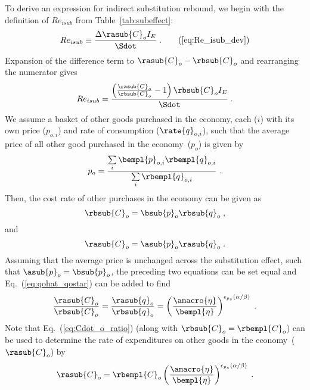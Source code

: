 To derive an expression for indirect substitution rebound,
we begin with the definition of $Re_{isub}$
from Table~\ref{tab:subeffect}:
%
\begin{equation}
  Re_{isub} \equiv \frac{\Delta \rasub{C}_o I_E}{\Sdot} \; .  \tag{\ref{eq:Re_isub_dev}}
\end{equation}
%
Expansion of the difference term to $\rasub{C}_o - \rbsub{C}_o$ and rearranging the numerator gives
%
\begin{equation} \label{eq:Re_isub_prelim}
  Re_{isub} = \frac{\left( \frac{\rasub{C}_o}{\rbsub{C}_o} - 1  \right) \rbsub{C}_o I_E} {\Sdot} \; .
\end{equation}
%
We assume a basket of other goods purchased in the economy,
each ($i$) with its own price ($p_{o,i}$) and rate of consumption ($\rate{q}_{o,i}$),
such that the average price of all other good purchased in the economy~($p_o$) is given by
%
\begin{equation}
  p_o = \frac{\sum\limits_i \bempl{p}_{o,i} \rbempl{q}_{o,i}}{\sum\limits_i \rbempl{q}_{o,i}} \; .
\end{equation}
%
Then, the cost rate of other purchases in the economy can be given as
%
\begin{equation}
  \rbsub{C}_o = \bsub{p}_o \rbsub{q}_o \; ,
\end{equation}
%
and
%
\begin{equation}
  \rasub{C}_o = \asub{p}_o \rasub{q}_o \; .
\end{equation}
%
Assuming that the average price is unchanged across the substitution effect,
such that $\asub{p}_o = \bsub{p}_o$,
the preceding two equations can be set equal and Eq.~(\ref{eq:qohat_qostar}) can be added to find
%
\begin{equation} \label{eq:Cdot_o_ratio}
  \frac{\rasub{C}_o}{\rbsub{C}_o} 
      = \frac{\rasub{q}_o}{\rbsub{q}_o} 
      = \left( \frac{\amacro{\eta}}{\bempl{\eta}} \right)^{\epsilon_{p_s} (\alpha / \beta)}  \; .
\end{equation}
%
Note that Eq.~(\ref{eq:Cdot_o_ratio}) 
(along with $\rbsub{C}_o = \rbempl{C}_o$)
can be used to determine the rate of expenditures 
on other goods in the economy~($\rasub{C}_o$) by
%
\begin{equation}
  \rasub{C}_o = \rbempl{C}_o \left( \frac{\amacro{\eta}}{\bempl{\eta}} \right)^{\epsilon_{p_s} (\alpha / \beta)} \; .
\end{equation}

